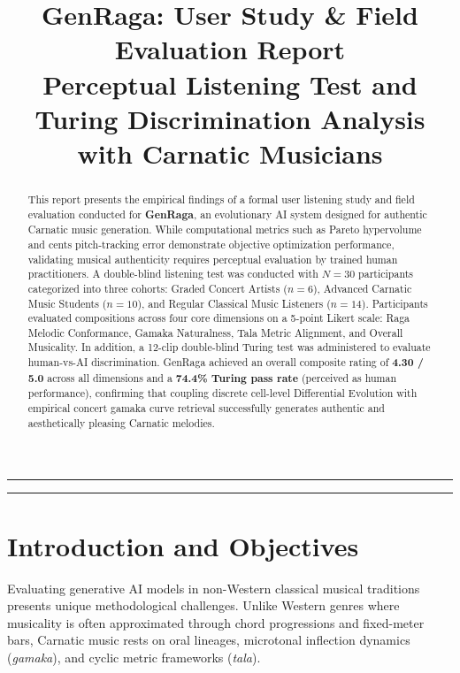 \documentclass[11pt,a4paper]{article}
\title{\textbf{\LARGE GenRaga: User Study \& Field Evaluation Report}\\[0.4em]
\large Perceptual Listening Test and Turing Discrimination Analysis with Carnatic Musicians}
\author{}
\date{}
\begin{document}
\maketitle
\thispagestyle{empty}
\vspace{-3em}

\vspace{-0.5em}
\hrule
\vspace{0.8em}

\begin{abstract}
This report presents the empirical findings of a formal user listening study and field evaluation conducted for \textbf{GenRaga}, an evolutionary AI system designed for authentic Carnatic music generation. While computational metrics such as Pareto hypervolume and cents pitch-tracking error demonstrate objective optimization performance, validating musical authenticity requires perceptual evaluation by trained human practitioners. A double-blind listening test was conducted with $N=30$ participants categorized into three cohorts: Graded Concert Artists ($n=6$), Advanced Carnatic Music Students ($n=10$), and Regular Classical Music Listeners ($n=14$). Participants evaluated compositions across four core dimensions on a 5-point Likert scale: Raga Melodic Conformance, Gamaka Naturalness, Tala Metric Alignment, and Overall Musicality. In addition, a 12-clip double-blind Turing test was administered to evaluate human-vs-AI discrimination. GenRaga achieved an overall composite rating of \textbf{4.30 / 5.0} across all dimensions and a \textbf{74.4\% Turing pass rate} (perceived as human performance), confirming that coupling discrete cell-level Differential Evolution with empirical concert gamaka curve retrieval successfully generates authentic and aesthetically pleasing Carnatic melodies.
\end{abstract}

\vspace{0.8em}
\hrule
\vspace{1.5em}

\section{Introduction and Objectives}
Evaluating generative AI models in non-Western classical musical traditions presents unique methodological challenges. Unlike Western genres where musicality is often approximated through chord progressions and fixed-meter bars, Carnatic music rests on oral lineages, microtonal inflection dynamics (\textit{gamaka}), and cyclic metric frameworks (\textit{tala}). 
\end{document}
